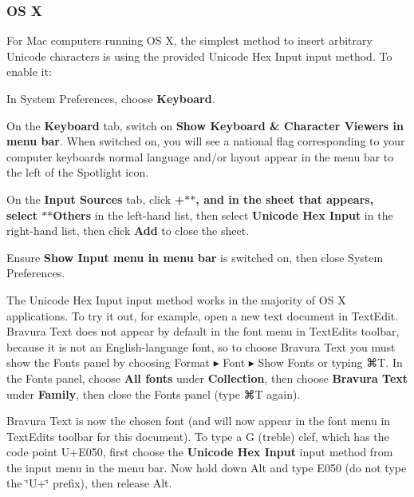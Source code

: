 \subsubsection*{OS X}

For Mac computers running OS X, the simplest method to insert arbitrary Unicode characters is using the provided Unicode Hex Input input method. To enable it\+:


\begin{DoxyItemize}
\item In System Preferences, choose {\bfseries Keyboard}.
\item On the {\bfseries Keyboard} tab, switch on {\bfseries Show Keyboard \& Character Viewers in menu bar}. When switched on, you will see a national flag corresponding to your computer keyboard\textquotesingle{}s normal language and/or layout appear in the menu bar to the left of the Spotlight icon.
\item On the {\bfseries Input Sources} tab, click {\bfseries +$\ast$$\ast$, and in the sheet that appears, select $\ast$$\ast$\+Others} in the left-\/hand list, then select {\bfseries Unicode Hex Input} in the right-\/hand list, then click {\bfseries Add} to close the sheet.
\item Ensure {\bfseries Show Input menu in menu bar} is switched on, then close System Preferences.
\end{DoxyItemize}

The Unicode Hex Input input method works in the majority of OS X applications. To try it out, for example, open a new text document in Text\+Edit. Bravura Text does not appear by default in the font menu in Text\+Edit\textquotesingle{}s toolbar, because it is not an English-\/language font, so to choose Bravura Text you must show the Fonts panel by choosing {\ttfamily Format} ▸ {\ttfamily Font} ▸ {\ttfamily Show Fonts} or typing {\ttfamily ⌘T}. In the Fonts panel, choose {\bfseries All fonts} under {\bfseries Collection}, then choose {\bfseries Bravura Text} under {\bfseries Family}, then close the Fonts panel (type {\ttfamily ⌘T} again).

Bravura Text is now the chosen font (and will now appear in the font menu in Text\+Edit\textquotesingle{}s toolbar for this document). To type a G (treble) clef, which has the code point U+\+E050, first choose the {\bfseries Unicode Hex Input} input method from the input menu in the menu bar. Now hold down {\ttfamily Alt} and type {\ttfamily E050} (do not type the \char`\"{}\+U+\char`\"{} prefix), then release {\ttfamily Alt}.

